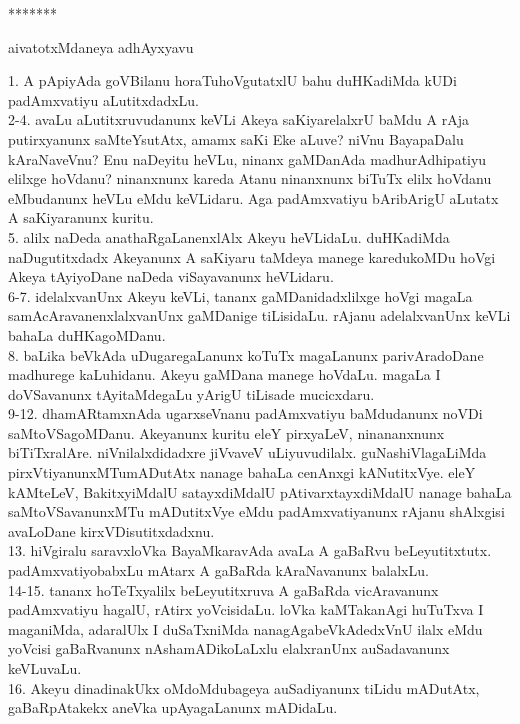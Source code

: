 \documentclass{article}
\begin{document}
\begin{center}
*******
\end{center}

\begin{center}
aivatotxMdaneya adhAyxyavu
\end{center}

1. A pApiyAda goVBilanu horaTuhoVgutatxlU bahu duHKadiMda kUDi padAmxvatiyu aLutitxdadxLu.\\
2-4. avaLu aLutitxruvudanunx keVLi Akeya saKiyarelalxrU baMdu A rAja putirxyanunx saMteYsutAtx, amamx saKi Eke aLuve? niVnu BayapaDalu kAraNaveVnu? Enu naDeyitu heVLu, ninanx gaMDanAda madhurAdhipatiyu elilxge hoVdanu? ninanxnunx kareda Atanu ninanxnunx biTuTx elilx hoVdanu eMbudanunx heVLu eMdu keVLidaru. Aga padAmxvatiyu bAribArigU aLutatx A saKiyaranunx kuritu.\\
5. alilx naDeda anathaRgaLanenxlAlx Akeyu heVLidaLu. duHKadiMda naDugutitxdadx Akeyanunx A saKiyaru taMdeya manege karedukoMDu hoVgi Akeya tAyiyoDane naDeda viSayavanunx heVLidaru.\\
6-7. idelalxvanUnx Akeyu keVLi, tananx gaMDanidadxlilxge hoVgi magaLa samAcAravanenxlalxvanUnx gaMDanige tiLisidaLu. rAjanu adelalxvanUnx keVLi bahaLa duHKagoMDanu.\\
8. baLika beVkAda uDugaregaLanunx koTuTx magaLanunx parivAradoDane madhurege kaLuhidanu. Akeyu gaMDana manege hoVdaLu. magaLa I doVSavanunx tAyitaMdegaLu yArigU tiLisade mucicxdaru.\\
9-12. dhamARtamxnAda ugarxseVnanu padAmxvatiyu baMdudanunx noVDi saMtoVSagoMDanu. Akeyanunx kuritu eleY pirxyaLeV, ninananxnunx biTiTxralAre. niVnilalxdidadxre jiVvaveV uLiyuvudilalx. guNashiVlagaLiMda pirxVtiyanunxMTumADutAtx nanage bahaLa cenAnxgi kANutitxVye. eleY kAMteLeV, BakitxyiMdalU satayxdiMdalU pAtivarxtayxdiMdalU nanage bahaLa saMtoVSavanunxMTu mADutitxVye eMdu padAmxvatiyanunx rAjanu shAlxgisi avaLoDane kirxVDisutitxdadxnu.\\
13. hiVgiralu saravxloVka BayaMkaravAda avaLa A gaBaRvu beLeyutitxtutx. padAmxvatiyobabxLu mAtarx A gaBaRda kAraNavanunx balalxLu.\\
14-15. tananx hoTeTxyalilx beLeyutitxruva A gaBaRda vicAravanunx padAmxvatiyu hagalU, rAtirx yoVcisidaLu. loVka kaMTakanAgi huTuTxva I maganiMda, adaralUlx I duSaTxniMda nanagAgabeVkAdedxVnU ilalx eMdu yoVcisi gaBaRvanunx nAshamADikoLaLxlu elalxranUnx auSadavanunx keVLuvaLu.\\
16. Akeyu dinadinakUkx oMdoMdubageya auSadiyanunx tiLidu mADutAtx, gaBaRpAtakekx aneVka upAyagaLanunx mADidaLu.\\
\end{document}
